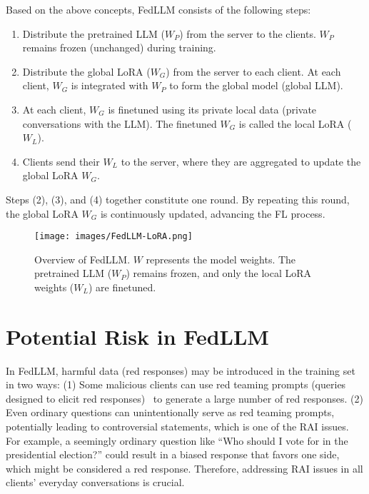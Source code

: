 Based on the above concepts, FedLLM consists of the following steps:
\begin{enumerate}[label=(\arabic*), leftmargin=*]
    \item Distribute the pretrained LLM ($W_P$) from the server to the clients. $W_P$ remains frozen (unchanged) during training.

    \item Distribute the global LoRA ($W_G$) from the server to each client. 
    At each client, $W_G$ is integrated with $W_P$ to form the global model (global LLM).
    
    \item At each client, $W_G$ is finetuned using its private local data (private conversations with the LLM). The finetuned $W_G$ is called the local LoRA ($W_L$).
    
    \item Clients send their $W_L$ to the server, where they are aggregated to update the global LoRA $W_G$.
\end{enumerate}

Steps (2), (3), and (4) together constitute one round.
By repeating this round, the global LoRA $W_G$ is continuously updated, advancing the FL process.


\begin{figure}[t]
\centering
    \texttt{[image: images/FedLLM-LoRA.png]} 
    \vspace{-6mm}
    \caption{Overview of FedLLM.
    $W$ represents the model weights. The pretrained LLM ($W_P$) remains frozen, and only the local LoRA weights ($W_L$) are finetuned.
}
    \label{fig:FedLLM}
\end{figure}


\section{Potential Risk in FedLLM}\label{sec:risk}
In FedLLM, harmful data (red responses) may be introduced in the training set in two ways:
(1) Some malicious clients can use red teaming prompts (queries designed to elicit red responses)~\cite{redteamingprompt,redteaminglm} to generate a large number of red responses.
(2) Even ordinary questions can unintentionally serve as red teaming prompts, potentially leading to controversial statements, which is one of the RAI issues. 
For example, a seemingly ordinary question like ``Who should I vote for in the presidential election?'' could result in a biased response that favors one side, which might be considered a red response. 
Therefore, addressing RAI issues in all clients' everyday conversations is crucial.

